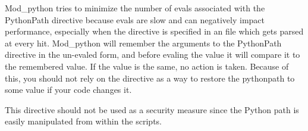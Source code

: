 Mod_python tries to minimize the number of evals associated with the
PythonPath directive because evals are slow and can negatively impact
performance, especially when the directive is specified in an
 file which gets parsed at every hit. Mod_python will
remember the arguments to the PythonPath directive in the un-evaled
form, and before evaling the value it will compare it to the
remembered value. If the value is the same, no action is
taken. Because of this, you should not rely on the directive as a way
to restore the pythonpath to some value if your code changes it.

\begin{notice}
  This directive should not be used as a security measure since the
  Python path is easily manipulated from within the scripts.
\end{notice}
